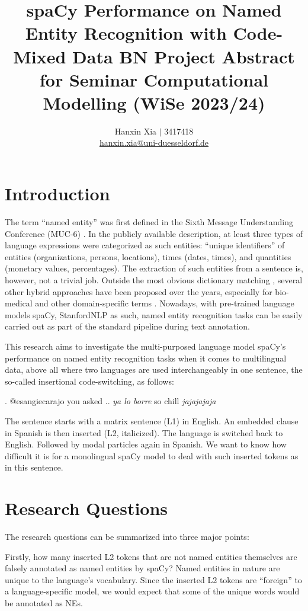 \documentclass[11pt]{article}
\title{spaCy Performance on Named Entity Recognition with Code-Mixed Data
\bigbreak \normalsize BN Project Abstract for Seminar Computational Modelling (WiSe 2023/24)}
\author{Hanxin Xia $\vert$ 3417418\\
  \href{mailto://hanxin.xia@uni-duesseldorf.de}{hanxin.xia@uni-duesseldorf.de}}
\begin{document}
\maketitle


\section{Introduction}

The term ``named entity'' was first defined in the Sixth Message Understanding Conference (MUC-6) \citep{grishman1996ner}. In the publicly available description, at least three types of language expressions were categorized as such entities: ``unique identifiers'' of entities (organizations, persons, locations), times (dates, times), and quantities (monetary values, percentages). The extraction of such entities from a sentence is, however, not a trivial job. Outside the most obvious dictionary matching \citep{higashinaka2012nerwiki,shang2018learning}, several other hybrid approaches have been proposed over the years, especially for bio-medical and other domain-specific terms \citep{rock2012nerbio,lou2020dicthyb}. Nowadays, with pre-trained language models spaCy, StanfordNLP as such, named entity recognition tasks can be easily carried out as part of the standard pipeline during text annotation.

This research aims to investigate the multi-purposed language model spaCy's performance on named entity recognition tasks when it comes to multilingual data, above all where two languages are used interchangeably in one sentence, the so-called insertional code-switching, as follows:

\ex. @esangiecarajo you asked .. \textit{ya lo borre} so chill \textit{jajajajaja}

The sentence starts with a matrix sentence (L1) in English. An embedded clause in Spanish is then inserted (L2, italicized). The language is switched back to English. Followed by modal particles again in Spanish. We want to know how difficult it is for a monolingual spaCy model to deal with such inserted tokens as in this sentence.


\section{Research Questions}

The research questions can be summarized into three major points:

Firstly, how many inserted L2 tokens that are not named entities themselves are falsely annotated as named entities by spaCy? Named entities in nature are unique to the language's vocabulary. Since the inserted L2 tokens are ``foreign'' to a language-specific model, we would expect that some of the unique words would be annotated as NEs.
\end{document}
